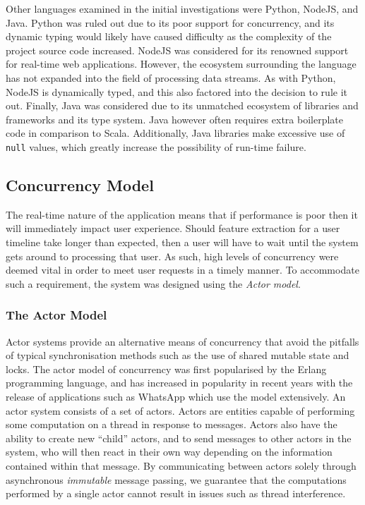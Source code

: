 \documentclass{l4proj}
\newcommand{\code}[1]{\texttt{#1}}
\begin{document}
        Other languages examined in the initial investigations were Python, NodeJS, and Java. Python was ruled out due to its poor support for concurrency, and its dynamic typing would likely have caused difficulty as the complexity of the project source code increased. NodeJS was considered for its renowned support for real-time web applications. However, the ecosystem surrounding the language has not expanded into the field of processing data streams. As with Python, NodeJS is dynamically typed, and this also factored into the decision to rule it out. Finally, Java was considered due to its unmatched ecosystem of libraries and frameworks and its type system. Java however often requires extra boilerplate code in comparison to Scala. Additionally, Java libraries make excessive use of \code{null} values, which greatly increase the possibility of run-time failure.

    \subsection{Concurrency Model}
    
    The real-time nature of the application means that if performance is poor then it will immediately impact user experience. Should feature extraction for a user timeline take longer than expected, then a user will have to wait until the system gets around to processing that user. As such, high levels of concurrency were deemed vital in order to meet user requests in a timely manner. To accommodate such a requirement, the system was designed using the \textit{Actor model}.
    
    \subsubsection{The Actor Model}

Actor systems provide an alternative means of concurrency that avoid the pitfalls of typical synchronisation methods such as the use of shared mutable state and locks. The actor model of concurrency was first popularised by the Erlang programming language, and has increased in popularity in recent years with the release of applications such as WhatsApp which use the model extensively. An actor system consists of a set of actors. Actors are entities capable of performing some computation on a thread in response to messages. Actors also have the ability to create new “child” actors, and to send messages to other actors in the system, who will then react in their own way depending on the information contained within that message. By communicating between actors solely through asynchronous \textit{immutable} message passing, we guarantee that the computations performed by a single actor cannot result in issues such as thread interference.
\end{document}
